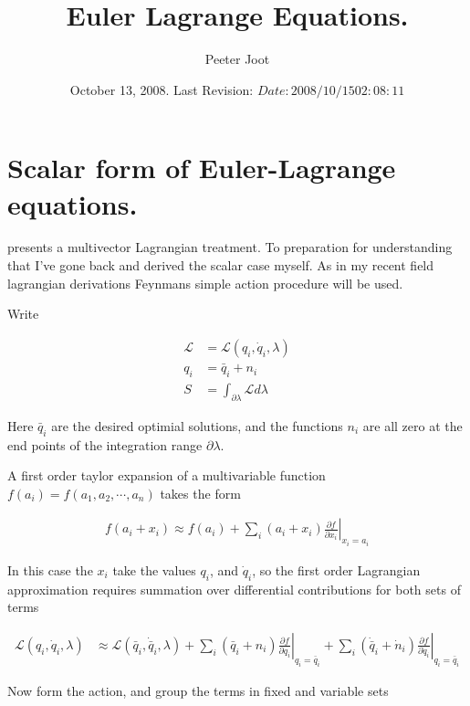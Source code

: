 \documentclass{article}
\title{Euler Lagrange Equations.}
\author{Peeter Joot}
\date{ October 13, 2008.  Last Revision: $Date: 2008/10/15 02:08:11 $ }
\newcommand{\LL}[0]{\mathcal{L}}
\newcommand{\qdot}[0]{\dot{q}}
\newcommand{\ndot}[0]{\dot{n}}
\newcommand{\qbar}[0]{\bar{q}}
\newcommand{\qdotbar}[0]{\dot{\bar{q}}}
\newcommand{\PD}[2]{\frac{\partial {#2}}{\partial {#1}}}
\begin{document}
\maketitle{}

\tableofcontents

\section{Scalar form of Euler-Lagrange equations.}

\cite{lasenby1993mda} presents a multivector Lagrangian treatment.  To
preparation for understanding that I've gone 
back and derived the scalar
case myself.  As in my recent field lagrangian derivations Feynmans
\cite{feynman1963flp} simple action procedure will be used.

Write 

\begin{align*}
\LL &= \LL(q_i, \qdot_i, \lambda) \\
q_i &= \qbar_i + n_i \\
S &= \int_{\partial \lambda} \LL d\lambda
\end{align*}

Here $\qbar_i$ are the desired optimial solutions, and the functions $n_i$
are all zero at the end points of the integration range $\partial \lambda$.

A first order taylor expansion of a multivariable function
$f(a_i) = f(a_1, a_2, \cdots, a_n)$
takes the form

\begin{align*}
f(a_i + x_i) \approx f(a_i) + \sum_i (a_i + x_i) \left. \PD{x_i}{f} \right\vert_{x_i = a_i}
\end{align*}

In this case the $x_i$ take the values $q_i$, and $\qdot_i$, so the first
order Lagrangian approximation requires summation over differential contributions for both sets of terms

\begin{align*}
\LL(q_i, \qdot_i, \lambda) 
&\approx \LL(\qbar_i, \qdotbar_i, \lambda) 
+ \sum_i (\qbar_i + n_i) \left. \PD{q_i}{f} \right\vert_{q_i = \qbar_i}
+ \sum_i (\qdotbar_i + \ndot_i) \left. \PD{\qdot_i}{f} \right\vert_{q_i = \qbar_i}
\end{align*}

%
Now form the action, and group the terms in fixed and variable sets
\end{document}
